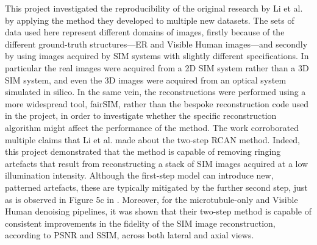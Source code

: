 \documentclass[12pt]{article}
\begin{document}
This project investigated the reproducibility of the original research by Li et al. by applying the method they developed to multiple new datasets.
The sets of data used here represent different domains of images,
firstly because of the different ground-truth structures---ER and Visible Human images---and secondly
by using images acquired by SIM systems with slightly different specifications.
In particular the real images were acquired from a 2D SIM system rather than a 3D SIM system,
and even the 3D images were acquired from an optical system simulated in silico.
In the same vein, the reconstructions were performed using a more widespread tool, fairSIM,
rather than the bespoke reconstruction code used in the project,
in order to investigate whether the specific reconstruction algorithm might affect the performance of the method.
The work corroborated multiple claims that Li et al. made about the two-step RCAN method.
Indeed, this project demonstrated that the method is capable of removing ringing artefacts that result from reconstructing a stack of SIM images acquired at a low illumination intensity.
Although the first-step model can introduce new, patterned artefacts, these are typically mitigated by the further second step,
just as is observed in Figure 5c in \cite{keypaper}.
Moreover, for the microtubule-only and Visible Human denoising pipelines,
it was shown that their two-step method is capable of consistent improvements in the fidelity of the SIM image reconstruction,
according to PSNR and SSIM, across both lateral and axial views.
\end{document}
